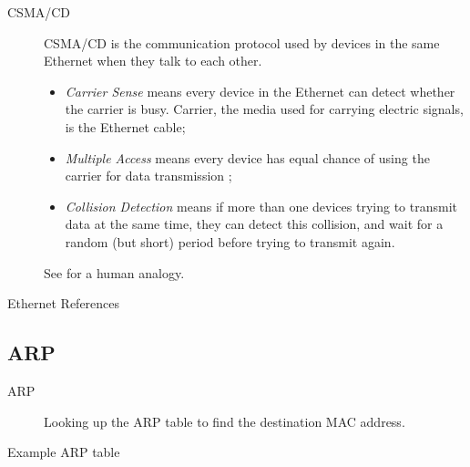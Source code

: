 \begin{description}
\item[CSMA/CD] CSMA/CD is the communication protocol used by devices in the same Ethernet
  when they talk to each other.
  \begin{itemize}
  \item \emph{Carrier Sense} means every device in the Ethernet can detect whether the
    carrier is busy. Carrier, the media used for carrying electric signals, is the Ethernet cable;
  \item \emph{Multiple Access} means every device has equal chance of using the carrier
    for data transmission ;
  \item \emph{Collision Detection} means if more than one devices trying to transmit
    data at the same time, they can detect this collision, and wait for a random (but
    short) period before trying to transmit again.
  \end{itemize}
  See  for a human analogy.
\end{description}

\begin{frame}{Ethernet References}
  \begin{refsection}
  \nocite{wiki:ethernet,wiki:ethframe,wiki:csmacd,rfc1042} \printbibliography[heading=none]
\end{refsection}
\end{frame}

\subsection{ARP}

\begin{frame}
  \begin{description}
  \item[ARP] Looking up the ARP table to find the destination MAC address.
  \end{description}
  \begin{block}{Example ARP table}
  \end{block}
\end{frame}


